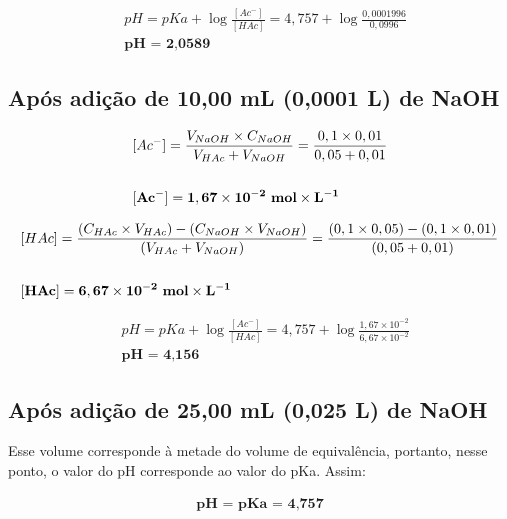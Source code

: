 \documentclass[a4paper, 12pt]{report}
\begin{document}
\begin{fleqn}
	\begin{align*}
		& pH = pKa + \log \frac{[Ac^{-}]}{[HAc]} = 4,757 + \log \frac{0,0001996}{0,0996} \\
		& \textbf{pH = 2,0589}
	\end{align*}
\end{fleqn}

\subsection{Após adição de 10,00 mL (0,0001 L) de NaOH}
\begin{fleqn}
	\begin{align*}
		& [Ac^{-}] = \frac{ V_{NaOH} \times C_{NaOH} }{ V_{HAc} + V_{NaOH} } = \frac{0,1 \times 0,01}{0,05 + 0,01} \\ \\
		& \mathbf{[Ac^{-}] = 1,67 \times 10^{-2} \text{ \textbf{mol}} \times L^{-1}}
	\end{align*}
\end{fleqn}

\begin{fleqn}
	\begin{align*}
		& [HAc] = \frac{ (C_{HAc} \times V_{HAc}) - (C_{NaOH} \times V_{NaOH}) }{ (V_{HAc} + V_{NaOH}) } = \frac{ (0,1 \times 0,05) - (0,1 \times 0,01) }{ (0,05 + 0,01) }\\ \\
		& \mathbf{[HAc] = 6,67 \times 10^{-2} \text{ \textbf{mol}} \times L^{-1}}
	\end{align*}
\end{fleqn}

\begin{fleqn}
	\begin{align*}
		& pH = pKa + \log \frac{[Ac^{-}]}{[HAc]} = 4,757 + \log \frac{1,67 \times 10^{-2}}{6,67 \times 10^{-2}} \\
		& \textbf{pH = 4,156}
	\end{align*}
\end{fleqn}

\subsection{Após adição de 25,00 mL (0,025 L) de NaOH}
Esse volume corresponde à metade do volume de equivalência, portanto, nesse ponto, o valor do pH corresponde ao valor do pKa. Assim:

\begin{fleqn}
	\begin{align*}
		 \textbf{pH = pKa = 4,757}
	\end{align*}
\end{fleqn}
\end{document}
